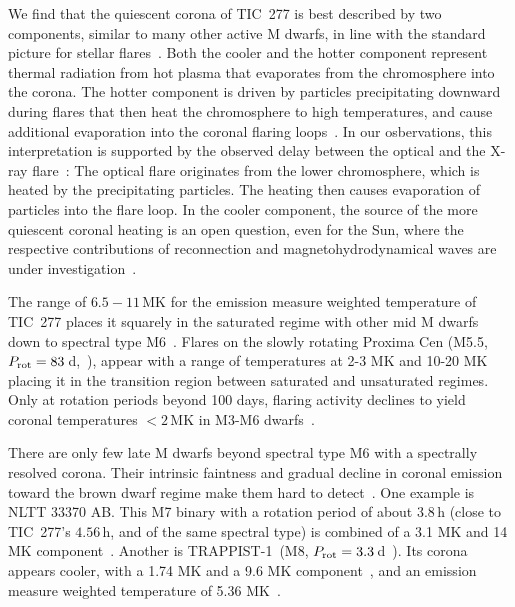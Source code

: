 \documentclass[twocolumn]{aastex631}
\begin{document}
We find that the quiescent corona of TIC~277 is best described by two components, similar to many other active M dwarfs, in line with the standard picture for stellar flares~\citep{wargelin2008xray, robrade2010quiescent, behr2023muscles, magaudda2022firsta}. Both the cooler and the hotter component represent thermal radiation from hot plasma that evaporates from the chromosphere into the corona. The hotter component is driven by particles precipitating downward during flares that then heat the chromosphere to high temperatures, and cause additional evaporation into the coronal flaring loops~\citep{benz2016flare}. In our osbervations, this interpretation is supported by the observed delay between the optical and the X-ray flare~\citep[Fig.~\ref{fig:lightcurves}, ][]{hawley2003multiwavelength}: The optical flare originates from the lower chromosphere, which is heated by the precipitating particles. The heating then causes evaporation of particles into the flare loop. In the cooler component, the source of the more quiescent coronal heating is an open question, even for the Sun, where the respective contributions of reconnection and magnetohydrodynamical waves are under investigation~\citep{vandoorsselaere2020coronal}.  %

The range of $6.5-11\,$MK for the emission measure weighted temperature of TIC~277 places it squarely in the saturated regime with other mid M dwarfs down to spectral type M6~\citep{wright2018stellar, magaudda2020relation, stelzer2022first,robrade2005xray,raassen2003xray,paudel2021simultaneous, foster2020corona}. Flares on the slowly rotating Proxima Cen (M5.5, $P_{\rm rot} = 83\,$d,~\citealt{anglada-escude2016terrestrial}), appear with a range of temperatures at 2-3 MK and 10-20 MK~\citep{gudel2004flares, fuhrmeister2011multiwavelength, fuhrmeister2022high, howard2022mouse} placing it in the transition region between saturated and unsaturated regimes. Only at rotation periods beyond 100 days, flaring activity declines to yield coronal temperatures $<2\,$MK in M3-M6 dwarfs~\citep{wright2018stellar, foster2020corona}. 

There are only few late M dwarfs beyond spectral type M6 with a spectrally resolved corona. Their intrinsic faintness and gradual decline in coronal emission toward the brown dwarf regime make them hard to detect~\citep{berger2010simultaneous, cook2014trends, stelzer2022first}. One example is NLTT 33370 AB. This M7 binary with a rotation period of about $3.8\,$h (close to TIC~277's $4.56\,$h, and of the same spectral type) is combined of a 3.1 MK and 14 MK component~\citep{williams2015simultaneous}. Another is TRAPPIST-1~(M8, $P_{\rm rot} = 3.3\,$d~\citealt{luger2017sevenplanet}). Its corona appears cooler, with a 1.74 MK and a 9.6 MK component~\citep{wheatley2017strong}, and an emission measure weighted temperature of 5.36 MK~\citep{brown2023coronal}. 
\end{document}
